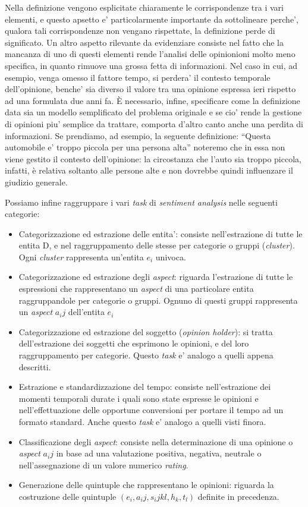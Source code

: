 \documentclass[a4paper,12pt,openright,twoside]{report}
\theoremstyle{definition}
\begin{document}
Nella definizione vengono esplicitate chiaramente le corrispondenze tra i vari elementi,
e questo apsetto e' particolarmente importante da sottolineare perche', 
qualora tali corrispondenze non vengano rispettate,
la definizione perde di significato.
Un altro aspetto rilevante da evidenziare consiste nel fatto che la mancanza di uno di questi elementi rende 
l'analisi delle opinionioni molto meno specifica, in quanto rimuove una grossa fetta di
informazioni. Nel caso in cui, ad esempio, venga omesso il fattore tempo, si perdera' il contesto
temporale dell'opinione, benche' sia diverso il valore tra una opinione espressa ieri rispetto ad una
formulata due anni fa.
\`E necessario, infine, specificare come la definizione data sia un modello semplificato del problema
originale e se cio' rende la gestione di opinioni piu' semplice da trattare,
comporta d'altro canto anche una perdita di informazioni. Se prendiamo, ad esempio, la seguente definizione:
``Questa automobile e' troppo piccola per una persona alta''
noteremo che in essa non viene gestito il contesto dell’opinione: la circostanza che l’auto sia troppo piccola, 
infatti, è relativa soltanto alle persone alte e non dovrebbe quindi influenzare il giudizio generale.

Possiamo infine raggruppare i vari \emph{task} di \emph{sentiment analysis} nelle seguenti categorie:
\begin{itemize}
	\item Categorizzazione ed estrazione delle entita': consiste nell'estrazione di tutte le entita D,
		e nel raggruppamento delle stesse per categorie o gruppi (\emph{cluster}). Ogni \emph{cluster}
		rappresenta un'entita $e_i$ univoca.
	\item Categorizzazione ed estrazione degli \emph{aspect}: riguarda l'estrazione di tutte le espressioni
		che rappresentano un \emph{aspect} di una particolare entita raggruppandole
		per categorie o gruppi. Ognuno di questi gruppi rappresenta un \emph{aspect} $a_ij$
		dell'entita $e_i$
	\item Categorizzazione ed estrazione del soggetto (\emph{opinion holder}): si tratta dell'estrazione
		dei soggetti che esprimono le opinioni, e del loro raggruppamento per categorie. Questo \emph{task}
		e' analogo a quelli appena descritti.
	\item Estrazione e standardizzazione del tempo: consiste nell'estrazione dei momenti temporali 
		durate i quali 
		sono state espresse le opinioni e nell'effettuazione delle opportune conversioni per portare
		il tempo ad un formato standard. Anche questo \emph{task} e' analogo a quelli visti finora.
	\item Classificazione degli \emph{aspect}: consiste nella determinazione di una opinione o \emph{aspect} $a_ij$
		in base ad una valutazione positiva, negativa, neutrale o nell'assegnazione di un valore numerico \emph{rating}.
	\item Generazione delle quintuple che rappresentano le opinioni: riguarda la costruzione delle quintuple 
		$(e_i, a_ij, s_ijkl, h_k, t_l)$ definite in precedenza.
\end{itemize}
\end{document}
